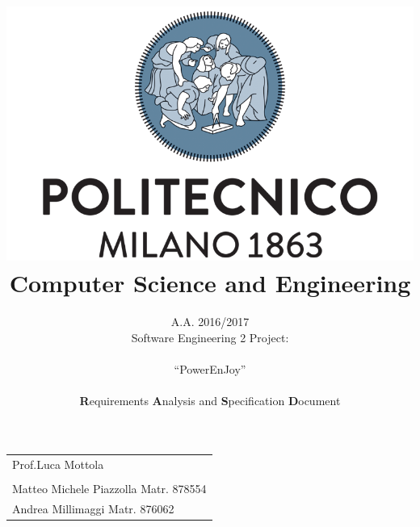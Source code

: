 \documentclass[english]{article}
\newcommand{\lyxrightaddress}[1]{
\par {\raggedleft \begin{tabular}{l}\ignorespaces
#1
\end{tabular}
\vspace{1.4em}
\par}
}
\begin{document}
\title{\includegraphics[scale=0.4]{img/polimi}\\
Computer Science and Engineering}

\begin{doublespace}

\author{A.A. 2016/2017\\
Software Engineering 2 Project: \\
\\
{\LARGE{}``PowerEnJoy''}\textbf{}\\
\\
\textbf{R}equirements \textbf{A}nalysis and \textbf{S}pecification
\textbf{D}ocument\\
}
\end{doublespace}

\maketitle

\lyxrightaddress{Prof.Luca Mottola\\
\\
Matteo Michele Piazzolla Matr. 878554\\
Andrea Millimaggi Matr. 876062}

\newpage{}
\listoftodos
\newpage{}

\tableofcontents{}

\newpage{}
\listoffigures

\newpage{}







\pagebreak


\end{document}
